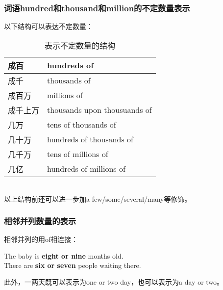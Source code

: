 \documentclass[UTF8]{ctexart}
\newcommand{\littf}[1]{{\hspace{3pt}\ttfamily #1}}
\begin{document}
\subsubsection{词语\littf{hundred}和\littf{thousand}和\littf{million}的不定数量表示}
    以下结构可以表达不定数量：
    \begin{table}[h]
        \begin{center}
            \ttfamily
            \begin{tabular}{p{80pt}|p{180pt}}
                \hline
                成百&hundreds of\\ \hline
                成千&thousands of\\ \hline
                成百万&millions of\\ \hline
                成千上万&thousands upon thousuands of\\  \hline
                几万&tens of thousands of\\  \hline
                几十万&hundreds of thousands of\\  \hline
                几千万&tens of millions of\\  \hline
                几亿&hundreds of millions of\\  \hline
            \end{tabular}
            \rmfamily
            \caption{表示不定数量的结构}
        \end{center}
    \end{table}\\
    以上结构前还可以进一步加\littf{a few/some/several/many}等修饰。\\

\subsubsection{相邻并列数量的表示}
    相邻并列的用\littf{of}相连接：
    \begin{center}
        \large\ttfamily
        The baby is \textbf{eight or nine} months old.\\[3mm]
        There are \textbf{six or seven} people waiting there.\\[6mm]
    \end{center}
    此外，一两天既可以表示为\littf{one or two day}，也可以表示为\littf{a day or two}。

\newpage
\end{document}
